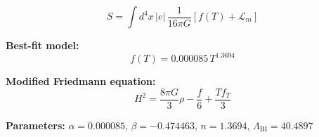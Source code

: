 
\begin{equation}
  S = \int d^4x \, |e| \, \frac{1}{16\pi G} \left[ f(T) + \mathcal{L}_m \right]
\end{equation}

\textbf{Best-fit model:}
\begin{equation}
  f(T) = 0.000085 \, T^{1.3694}
\end{equation}

\textbf{Modified Friedmann equation:}
\begin{equation}
  H^2 = \frac{8\pi G}{3} \rho - \frac{f}{6} + \frac{T f_T}{3}
\end{equation}

\textbf{Parameters:}
$\alpha = 0.000085$, \quad
$\beta = -0.474463$, \quad
$n = 1.3694$, \quad
$\Lambda_{\text{BI}} = 40.4897$